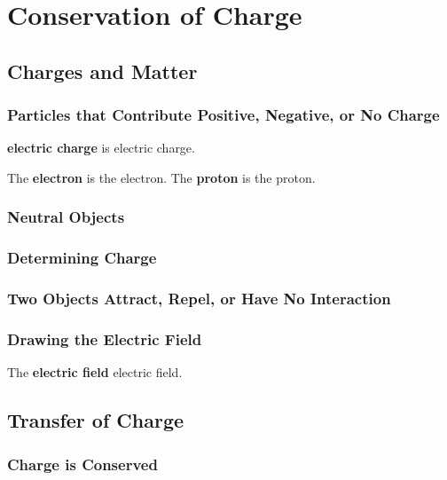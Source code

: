 \documentclass[dvipsnames]{article}
\newif\ifShowUnitIX                              %
\begin{document}
\fi

\clearpage


\section{Conservation of Charge}

\ifShowUnitIX

\subsection{Charges and Matter}

\subsubsection{Particles that Contribute Positive, Negative, or No Charge}

\textbf{\Gls{electric charge}} is \glsdesc{electric charge}.

The \textbf{\gls{electron}} is the \glsdesc{electron}. The \textbf{\gls{proton}} is the \glsdesc{proton}.

\subsubsection{Neutral Objects}

\subsubsection{Determining Charge}

\subsubsection{Two Objects Attract, Repel, or Have No Interaction}

\subsubsection{Drawing the Electric Field}

The \textbf{\gls{electric field}} \glsdesc{electric field}.

\subsection{Transfer of Charge}

\subsubsection{Charge is Conserved}
\end{document}
